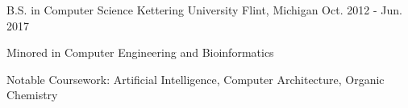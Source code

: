 
\begin{cventries}




  \cventry
    {B.S. in Computer Science} %
    {Kettering University} %
    {Flint, Michigan} %
    {Oct. 2012 - Jun. 2017} %
    {
      \begin{cvitems} %
        \item {Minored in Computer Engineering and Bioinformatics}
        \item {Notable Coursework: Artificial Intelligence, Computer Architecture, Organic Chemistry}
      \end{cvitems}
    }


\end{cventries}
